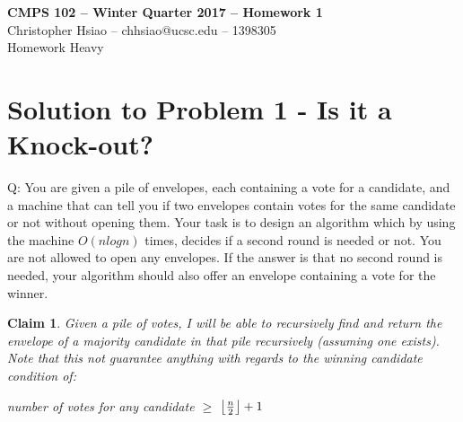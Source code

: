 \documentclass[11pt]{article}
\DeclarePairedDelimiter\floor{\lfloor}{\rfloor}
\newtheorem{claim}[theorem]{Claim}
\begin{document}
\begin{center}
{\bf\Large CMPS 102 -- Winter Quarter 2017 --  Homework 1}\\
Christopher Hsiao -- chhsiao@ucsc.edu -- 1398305\\
Homework Heavy
\end{center}

\section*{Solution to Problem 1 - Is it a Knock-out?}
Q: 
You are given a pile of envelopes, each containing a vote for a candidate, and a machine that can tell you if two envelopes contain votes for the same candidate or not without opening them. Your task is to design an algorithm which by using the machine $O(nlogn)$ times, decides if a second round is needed or not. You are not allowed to open any envelopes. If the answer is that no second round is needed, your algorithm should also offer an envelope containing a vote for the winner.
\begin{claim} 
Given a pile of votes, I will be able to recursively find and return the envelope of a majority candidate in that pile recursively (assuming one exists). Note that this not guarantee anything with regards to the winning candidate condition of: 
	\begin{center}
		number of votes for any candidate $\geq$ $\floor*{\frac{n}{2}} + 1$
	\end{center}
\end{claim}
\end{document}
